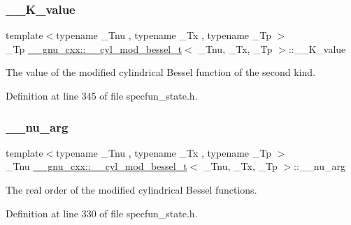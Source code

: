 \subsubsection{\texorpdfstring{\+\_\+\+\_\+\+K\+\_\+value}{\_\_K\_value}}
{\footnotesize\ttfamily template$<$typename \+\_\+\+Tnu , typename \+\_\+\+Tx , typename \+\_\+\+Tp $>$ \\
\+\_\+\+Tp \hyperlink{struct____gnu__cxx_1_1____cyl__mod__bessel__t}{\+\_\+\+\_\+gnu\+\_\+cxx\+::\+\_\+\+\_\+cyl\+\_\+mod\+\_\+bessel\+\_\+t}$<$ \+\_\+\+Tnu, \+\_\+\+Tx, \+\_\+\+Tp $>$\+::\+\_\+\+\_\+\+K\+\_\+value}



The value of the modified cylindrical Bessel function of the second kind. 



Definition at line 345 of file specfun\+\_\+state.\+h.

\mbox{\label{struct____gnu__cxx_1_1____cyl__mod__bessel__t_a482597cb5cc7de3449debeb0a451a757}} 
\subsubsection{\texorpdfstring{\+\_\+\+\_\+nu\+\_\+arg}{\_\_nu\_arg}}
{\footnotesize\ttfamily template$<$typename \+\_\+\+Tnu , typename \+\_\+\+Tx , typename \+\_\+\+Tp $>$ \\
\+\_\+\+Tnu \hyperlink{struct____gnu__cxx_1_1____cyl__mod__bessel__t}{\+\_\+\+\_\+gnu\+\_\+cxx\+::\+\_\+\+\_\+cyl\+\_\+mod\+\_\+bessel\+\_\+t}$<$ \+\_\+\+Tnu, \+\_\+\+Tx, \+\_\+\+Tp $>$\+::\+\_\+\+\_\+nu\+\_\+arg}



The real order of the modified cylindrical Bessel functions. 



Definition at line 330 of file specfun\+\_\+state.\+h.

\mbox{\label{struct____gnu__cxx_1_1____cyl__mod__bessel__t_ad23dcffe64b074804b84abe4d0da7515}} 
